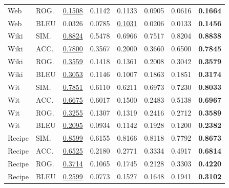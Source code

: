 {\begin{longtable}{llrrrrrr}
Web & ROG. & \underline{0.1508} & 0.1142 & 0.1133 & 0.0905 & 0.0616 & \textbf{0.1664} \\
Web & BLEU & 0.0326 & 0.0785 & \underline{0.1031} & 0.0206 & 0.0133 & \textbf{0.1456} \\
Wiki & SIM. & \underline{0.8824} & 0.5478 & 0.6966 & 0.7517 & 0.8204 & \textbf{0.8838} \\
Wiki & ACC. & \underline{0.7800} & 0.3567 & 0.2000 & 0.3660 & 0.6500 & \textbf{0.7845} \\
Wiki & ROG. & \underline{0.3559} & 0.1418 & 0.1361 & 0.2008 & 0.3042 & \textbf{0.3579} \\
Wiki & BLEU & \underline{0.3053} & 0.1146 & 0.1007 & 0.1863 & 0.1851 & \textbf{0.3174} \\
Wit & SIM. & \underline{0.7851} & 0.6110 & 0.6211 & 0.6973 & 0.7230 & \textbf{0.8033} \\
Wit & ACC. & \underline{0.6675} & 0.6017 & 0.1500 & 0.2483 & 0.5138 & \textbf{0.6967} \\
Wit & ROG. & \underline{0.3255} & 0.1307 & 0.1319 & 0.2416 & 0.2712 & \textbf{0.3589} \\
Wit & BLEU & \underline{0.2095} & 0.0934 & 0.1142 & 0.1928 & 0.1200 & \textbf{0.2382} \\
Recipe & SIM. & \underline{0.8599} & 0.6155 & 0.8166 & 0.8118 & 0.7792 & \textbf{0.8673} \\
Recipe & ACC. & \underline{0.6525} & 0.2180 & 0.2771 & 0.3334 & 0.4917 & \textbf{0.6814} \\
Recipe & ROG. & \underline{0.3714} & 0.1065 & 0.1745 & 0.2128 & 0.3303 & \textbf{0.4220} \\
Recipe & BLEU & \underline{0.2599} & 0.0773 & 0.1527 & 0.1648 & 0.1941 & \textbf{0.3102} \\
\end{longtable}
}
